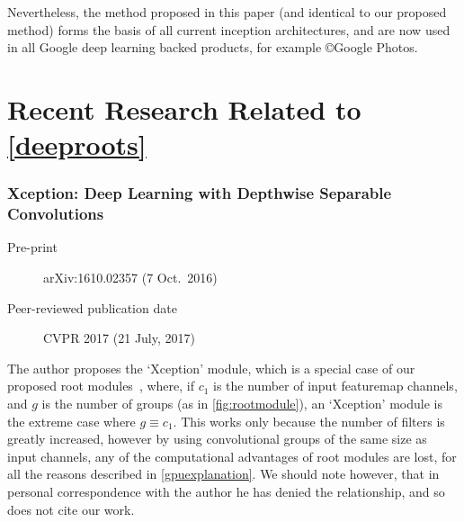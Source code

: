 \documentclass[thesis]{subfiles}
\begin{document}
Nevertheless, the method proposed in this paper (and identical to our proposed method) forms the basis of all current \Gls{inception} architectures, and are now used in all Google deep learning backed products, for example \copyright{}Google Photos.

\section{Recent Research Related to \cref{deeproots}}
\subsubsection*{Xception: Deep Learning with Depthwise Separable Convolutions}
\begin{description}
    \item[Pre-print] arXiv:1610.02357 (7 Oct.\ 2016)
    \item[Peer-reviewed publication date] CVPR 2017 (21 July, 2017)
\end{description}
The author proposes the `Xception' module, which is a special case of our proposed root modules~\cite{ioannou2016e}, where, if $c_1$ is the number of input \gls{featuremap} channels, and $g$ is the number of groups (as in \cref{fig:rootmodule}), an `Xception' module is the extreme case where $g \equiv c_1$. This works only because the number of filters is greatly increased, however by using convolutional groups of the same size as input channels, any of the computational advantages of root modules are lost, for all the reasons described in \cref{gpuexplanation}. We should note however, that in personal correspondence with the author he has denied the relationship, and so does not cite our work.

\end{document}
